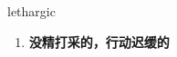 
\begin{frame}
{\huge lethargic}
\begin{center}
\begin{enumerate}\Large
  \item \textbf{没精打采的，行动迟缓的}
\end{enumerate}
\end{center}
\end{frame}
